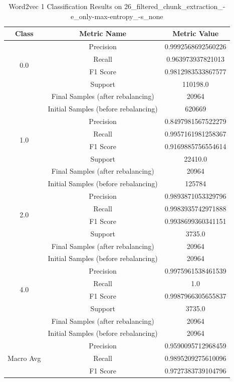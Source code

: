 \begin{longtable}{|c|c|c|}
\caption{Word2vec 1 Classification Results on 26\_filtered\_chunk\_extraction\_-e\_only-max-entropy\_-s\_none} \label{tab:26_filtered_chunk_extraction_-e_only-max-entropy_-s_none_word2vec_1_classifiers_results} \\
\hline
Class & Metric Name & Metric Value \\
\hline
\multirow{4}{*}{0.0} & Precision & 0.9992568692560226 \\
 & Recall & 0.963973937821013 \\
 & F1 Score & 0.9812983533867577 \\
 & Support & 110198.0 \\
 & Final Samples (after rebalancing) & 20964 \\
 & Initial Samples (before rebalancing) & 620669 \\
\hline
\multirow{4}{*}{1.0} & Precision & 0.8497981567522279 \\
 & Recall & 0.9957161981258367 \\
 & F1 Score & 0.9169885756554614 \\
 & Support & 22410.0 \\
 & Final Samples (after rebalancing) & 20964 \\
 & Initial Samples (before rebalancing) & 125784 \\
\hline
\multirow{4}{*}{2.0} & Precision & 0.9893871053329796 \\
 & Recall & 0.9983935742971888 \\
 & F1 Score & 0.9938699360341151 \\
 & Support & 3735.0 \\
 & Final Samples (after rebalancing) & 20964 \\
 & Initial Samples (before rebalancing) & 20964 \\
\hline
\multirow{4}{*}{4.0} & Precision & 0.9975961538461539 \\
 & Recall & 1.0 \\
 & F1 Score & 0.9987966305655837 \\
 & Support & 3735.0 \\
 & Final Samples (after rebalancing) & 20964 \\
 & Initial Samples (before rebalancing) & 20964 \\
\hline
\multirow{4}{*}{Macro Avg} & Precision & 0.9590095712968459 \\
 & Recall & 0.9895209275610096 \\
 & F1 Score & 0.9727383739104796 \\

\end{longtable}
